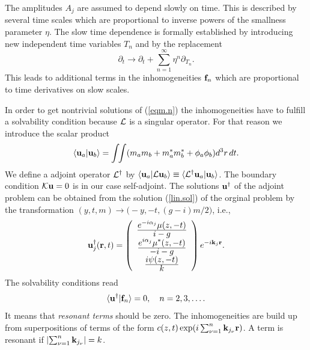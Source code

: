 The amplitudes $A_j$ are assumed to depend slowly on time. This is 
described by several time scales which are proportional to inverse
powers of the smallness parameter $\eta$. The slow time dependence is
formally established by introducing new independent time variables
$T_n$ and by the replacement
\begin{equation}
  \partial_t\to\partial_t+\sum\limits_{n=1}^\infty\eta^n\partial
   _{T_n}.
  \label{dt}
\end{equation}
This leads to additional terms in the inhomogeneities ${\bf f}_n$ 
which are proportional to time derivatives on slow scales.

In order to get nontrivial solutions of (\ref{eqm.n}) the
inhomogeneities have to fulfill a solvability condition because $\cal
L$ is a singular operator. For that reason we introduce the scalar
product
\begin{equation}
  \langle{\bf u}_a|{\bf u}_b\rangle=\int\!\!\int(m_am_b+m_a^*m_b^*
   +\phi_a\phi_b)d^3r\,dt.
  \label{sp}
\end{equation}
We define a adjoint operator ${\cal L}^\dagger$ by $\langle{\bf u}_a|
{\cal L}{\bf u}_b\rangle\equiv \langle{\cal L}^\dagger{\bf u}_a|{\bf
u}_b\rangle$.  The boundary condition ${\cal K}{\bf u}=0$ is in our
case self-adjoint.  The solutions ${\bf u}^\dagger$ of the adjoint
problem can be obtained from the solution (\ref{lin.sol}) of the
orginal problem by the transformation
$(y,t,m)\to\bigl(-y,-t,(g-i)m/2\bigr)$, i.e.,
\begin{equation}
  {\bf u}_j^\dagger({\bf r},t)=\left(\begin{array}{c}
  {\displaystyle e^{-i\alpha_j}\mu(z,-t)\over\displaystyle i-g}\\
  {\displaystyle e^{i\alpha_j}\mu^*(z,-t)\over\displaystyle -i-g}\\
  {\displaystyle i\psi(z,-t)\over\displaystyle k}\end{array}\right)
  e^{-i{\bf k}_j{\bf r}}.
  \label{u.adj}
\end{equation}
The solvability conditions read
\begin{equation}
  \langle{\bf u}^\dagger|{\bf f}_n\rangle=0,\quad n=2,3,\ldots.
  \label{solv.con}
\end{equation}
It means that {\em resonant terms\/} should be zero. The
inhomogeneities are build up from superpositions of terms of the form
$c(z,t)\exp(i\sum_{\nu=1}^n{\bf k}_{j_\nu}{\bf r})$. A term is
resonant if $\left|\sum_{\nu=1}^n{\bf k}_{j_\nu}\right|=k$.

